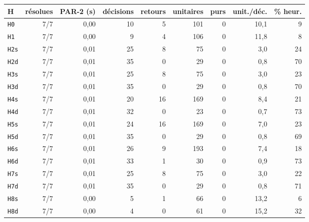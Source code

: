 \begin{tabular}{lrrrrrrrr}
\toprule
H & résolues & PAR-2 (s) & décisions & retours & unitaires & purs & unit./déc. & \% heur. \\
\midrule
\texttt{H0} & 7/7 & 0{,}00 & 10 & 5 & 101 & 0 & 10{,}1 & 9 \\
\texttt{H1} & 7/7 & 0{,}00 & 9 & 4 & 106 & 0 & 11{,}8 & 8 \\
\texttt{H2s} & 7/7 & 0{,}01 & 25 & 8 & 75 & 0 & 3{,}0 & 24 \\
\texttt{H2d} & 7/7 & 0{,}01 & 35 & 0 & 29 & 0 & 0{,}8 & 70 \\
\texttt{H3s} & 7/7 & 0{,}01 & 25 & 8 & 75 & 0 & 3{,}0 & 23 \\
\texttt{H3d} & 7/7 & 0{,}01 & 35 & 0 & 29 & 0 & 0{,}8 & 70 \\
\texttt{H4s} & 7/7 & 0{,}01 & 20 & 16 & 169 & 0 & 8{,}4 & 21 \\
\texttt{H4d} & 7/7 & 0{,}01 & 32 & 0 & 23 & 0 & 0{,}7 & 73 \\
\texttt{H5s} & 7/7 & 0{,}01 & 24 & 16 & 169 & 0 & 7{,}0 & 23 \\
\texttt{H5d} & 7/7 & 0{,}01 & 35 & 0 & 29 & 0 & 0{,}8 & 69 \\
\texttt{H6s} & 7/7 & 0{,}01 & 26 & 9 & 193 & 0 & 7{,}4 & 18 \\
\texttt{H6d} & 7/7 & 0{,}01 & 33 & 1 & 30 & 0 & 0{,}9 & 73 \\
\texttt{H7s} & 7/7 & 0{,}01 & 25 & 8 & 75 & 0 & 3{,}0 & 22 \\
\texttt{H7d} & 7/7 & 0{,}01 & 35 & 0 & 29 & 0 & 0{,}8 & 71 \\
\texttt{H8s} & 7/7 & 0{,}00 & 5 & 1 & 66 & 0 & 13{,}2 & 6 \\
\texttt{H8d} & 7/7 & 0{,}00 & 4 & 0 & 61 & 0 & 15{,}2 & 32 \\
\bottomrule
\end{tabular}
